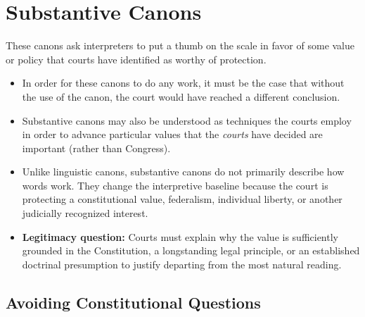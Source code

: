 \documentclass[11pt]{tex/lawoutline}
\begin{document}
\section{Substantive Canons}
{These canons ask interpreters to put a thumb on the scale in favor of some value or policy that courts have identified as worthy of protection.}
\begin{itemize}
    \item In order for these canons to do any work, it must be the case that without the use of the canon, the court would have reached a different conclusion.
    \item Substantive canons may also be understood as techniques the courts employ in order to advance particular values that the \textit{courts} have decided are important (rather than Congress).
    \item Unlike linguistic canons, substantive canons do not primarily describe how words work. They change the interpretive baseline because the court is protecting a constitutional value, federalism, individual liberty, or another judicially recognized interest.
    \item \textbf{Legitimacy question:} Courts must explain why the value is sufficiently grounded in the Constitution, a longstanding legal principle, or an established doctrinal presumption to justify departing from the most natural reading.
\end{itemize}

\subsection{Avoiding Constitutional Questions}
\end{document}
